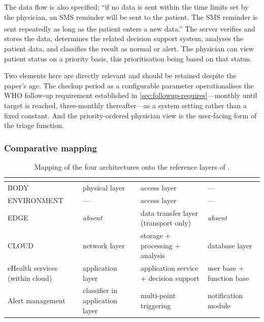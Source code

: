 \documentclass[12pt,a4paper,oneside]{report}
\newcommand{\bq}[1]{``#1''\textsuperscript{\dag}}
\begin{document}
The data flow is also specified: \bq{if no data is sent within the time limits set by the physician, an SMS reminder will be sent to the patient. The SMS reminder is sent repeatedly as long as the patient enters a new data.} The server verifies and stores the data, determines the related decision support system, analyses the patient data, and classifies the result as normal or alert. The physician can view patient status on a priority basis, this prioritisation being based on that status.

Two elements here are directly relevant and should be retained despite the paper's age. The checkup period as a configurable parameter operationalises the WHO follow-up requirement established in \cref{sec:followup-requires}---monthly until target is reached, three-monthly thereafter---as a system setting rather than a fixed constant. And the priority-ordered physician view is the user-facing form of the triage function.

\subsubsection{Comparative mapping}

\begin{table}[htbp]
\centering\footnotesize
\caption{Mapping of the four architectures onto the reference layers of \textcite{mucchi2021}.}\label{tab:layer-mapping}
\begin{tabularx}{\textwidth}{@{}>{\raggedright\arraybackslash}p{3.0cm} >{\raggedright\arraybackslash}X >{\raggedright\arraybackslash}X >{\raggedright\arraybackslash}X@{}}
\toprule
\textbf{\textcite{mucchi2021}} & \textbf{\textcite{efendi2025}} & \textbf{\textcite{liu2025review}} & \textbf{\textcite{yazdani2018}} \\
\midrule
BODY & physical layer & access layer & --- \\
ENVIRONMENT & --- & access layer & --- \\
EDGE & \emph{absent} & data transfer layer (transport only) & \emph{absent} \\
CLOUD & network layer & storage + processing + analysis & database layer \\
eHealth services (within cloud) & application layer & application service + decision support & user base + function base \\
Alert management & classifier in application layer & multi-point triggering & notification module \\
\bottomrule
\end{tabularx}
\end{table}
\end{document}
